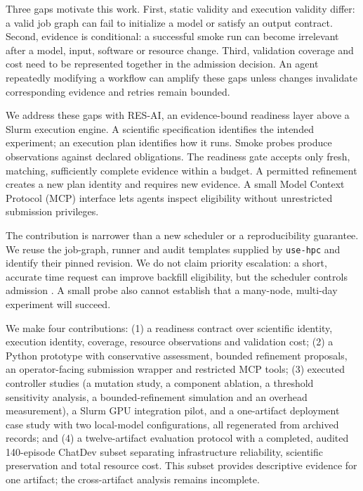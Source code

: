 \documentclass[pdflatex,sn-mathphys-num]{sn-jnl}
\theoremstyle{thmstylethree}
\newcommand{\tool}{\textsc{RES-AI}}
\newcommand{\upstream}{\texttt{use-hpc}}
\begin{document}
Three gaps motivate this work. First, static validity and execution validity differ: a valid job graph can fail to initialize a model or satisfy an output contract. Second, evidence is conditional: a successful smoke run can become irrelevant after a model, input, software or resource change. Third, validation coverage and cost need to be represented together in the admission decision. An agent repeatedly modifying a workflow can amplify these gaps unless changes invalidate corresponding evidence and retries remain bounded.

We address these gaps with \tool{}, an evidence-bound readiness layer above a Slurm execution engine. A scientific specification identifies the intended experiment; an execution plan identifies how it runs. Smoke probes produce observations against declared obligations. The readiness gate accepts only fresh, matching, sufficiently complete evidence within a budget. A permitted refinement creates a new plan identity and requires new evidence. A small Model Context Protocol (MCP) interface lets agents inspect eligibility without unrestricted submission privileges.

The contribution is narrower than a new scheduler or a reproducibility guarantee. We reuse the job-graph, runner and audit templates supplied by \upstream{} and identify their pinned revision. We do not claim priority escalation: a short, accurate time request can improve backfill eligibility, but the scheduler controls admission \cite{schedmdScheduling}. A small probe also cannot establish that a many-node, multi-day experiment will succeed.

We make four contributions: (1) a readiness contract over scientific identity, execution identity, coverage, resource observations and validation cost; (2) a Python prototype with conservative assessment, bounded refinement proposals, an operator-facing submission wrapper and restricted MCP tools; (3) executed controller studies (a mutation study, a component ablation, a threshold sensitivity analysis, a bounded-refinement simulation and an overhead measurement), a Slurm GPU integration pilot, and a one-artifact deployment case study with two local-model configurations, all regenerated from archived records; and (4) a twelve-artifact evaluation protocol with a completed, audited 140-episode ChatDev subset separating infrastructure reliability, scientific preservation and total resource cost. This subset provides descriptive evidence for one artifact; the cross-artifact analysis remains incomplete.
\end{document}
